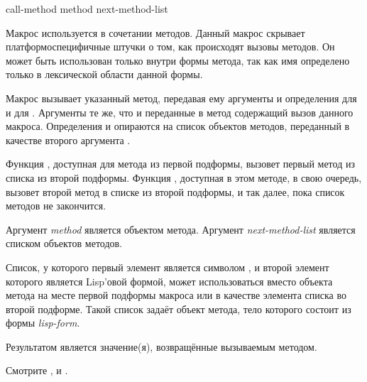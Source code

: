 \begin{defmac}
call-method method next-method-list

Макрос  используется в сочетании методов. Данный макрос
скрывает платформоспецифичные штучки о том, как происходят вызовы методов.
Он может быть использован только внутри формы метода, так как имя
 определено только в лексической области данной формы.

Макрос  вызывает указанный метод, передавая ему аргументы и
определения для  и для . Аргументы те
же, что и переданные в метод содержащий вызов данного макроса. Определения
 и  опираются на список объектов
методов, переданный в качестве второго аргумента .

Функция , доступная для метода из первой подформы, 
вызовет первый метод из списка из второй подформы. Функция
, доступная в этом методе, в свою очередь, вызовет второй
метод в списке из второй подформы, и так далее, пока список методов не
закончится.

Аргумент \emph{method} является объектом метода. Аргумент
\emph{next-method-list} является списком объектов методов.

Список, у которого первый элемент является символом , и второй
элемент которого является Lisp'овой формой, может использоваться вместо объекта
метода на месте первой подформы макроса  или в качестве
элемента списка во второй подформе. Такой список 
задаёт объект метода, тело которого состоит из формы \emph{lisp-form}.

Результатом  является значение(я), возвращённые вызываемым
методом.

Смотрите ,  и
.
\end{defmac}


